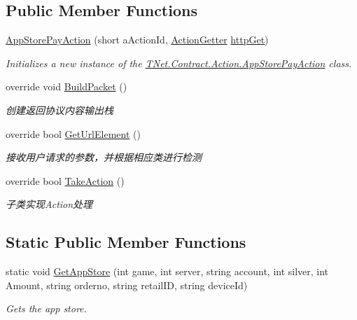 \subsection*{Public Member Functions}
\begin{DoxyCompactItemize}
\item 
\mbox{\hyperlink{class_t_net_1_1_contract_1_1_action_1_1_app_store_pay_action_a0dc9a21fc94a4a98a1a26eec2725637b}{App\+Store\+Pay\+Action}} (short a\+Action\+Id, \mbox{\hyperlink{class_t_net_1_1_service_1_1_action_getter}{Action\+Getter}} \mbox{\hyperlink{class_t_net_1_1_service_1_1_base_struct_a04c1171f14d9ee44612f9966a8d61d30}{http\+Get}})
\begin{DoxyCompactList}\small\item\em Initializes a new instance of the \mbox{\hyperlink{class_t_net_1_1_contract_1_1_action_1_1_app_store_pay_action}{T\+Net.\+Contract.\+Action.\+App\+Store\+Pay\+Action}} class. \end{DoxyCompactList}\item 
override void \mbox{\hyperlink{class_t_net_1_1_contract_1_1_action_1_1_app_store_pay_action_a8d473e0f226db2fc98e8c543fc674874}{Build\+Packet}} ()
\begin{DoxyCompactList}\small\item\em 创建返回协议内容输出栈 \end{DoxyCompactList}\item 
override bool \mbox{\hyperlink{class_t_net_1_1_contract_1_1_action_1_1_app_store_pay_action_aec7e467d4f96711435b3be29bb0ecdce}{Get\+Url\+Element}} ()
\begin{DoxyCompactList}\small\item\em 接收用户请求的参数，并根据相应类进行检测 \end{DoxyCompactList}\item 
override bool \mbox{\hyperlink{class_t_net_1_1_contract_1_1_action_1_1_app_store_pay_action_a23f443cab7cfe7507638e2bc32030e49}{Take\+Action}} ()
\begin{DoxyCompactList}\small\item\em 子类实现\+Action处理 \end{DoxyCompactList}\end{DoxyCompactItemize}
\subsection*{Static Public Member Functions}
\begin{DoxyCompactItemize}
\item 
static void \mbox{\hyperlink{class_t_net_1_1_contract_1_1_action_1_1_app_store_pay_action_a7328d10c16fd2ffb19fd4c28ba1c7019}{Get\+App\+Store}} (int game, int server, string account, int silver, int Amount, string orderno, string retail\+ID, string device\+Id)
\begin{DoxyCompactList}\small\item\em Gets the app store. \end{DoxyCompactList}\end{DoxyCompactItemize}

